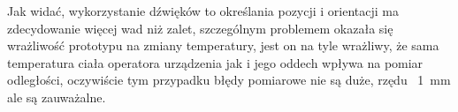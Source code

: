 Jak widać, wykorzystanie dźwięków to określania pozycji i orientacji ma zdecydowanie więcej wad niż zalet,
szczególnym problemem okazała się wrażliwość prototypu na zmiany temperatury, jest on na tyle wrażliwy, że 
sama temperatura ciała operatora urządzenia jak i jego oddech wpływa na pomiar odległości, oczywiście tym przypadku błędy pomiarowe
nie są duże, rzędu ~\SI{1}{mm} ale są zauważalne.
